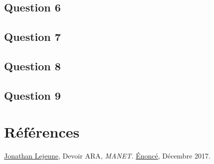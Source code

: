 \documentclass[10pt]{report}
\begin{document}
\subsection{Question 6}
\subsection{Question 7}
\subsection{Question 8}
\subsection{Question 9}
\newpage
\section*{Références}
\href{https://pages.lip6.fr/Jonathan.Lejeune/}{Jonathan Lejeune}, Devoir ARA, \textit{MANET.} \href{https://pages.lip6.fr/Jonathan.Lejeune/documents/enseignements/ARA/sujet\_devoir\_2017\_2018.pdf}{Énoncé}, Décembre 2017.
\newline
\newline
\end{document}
